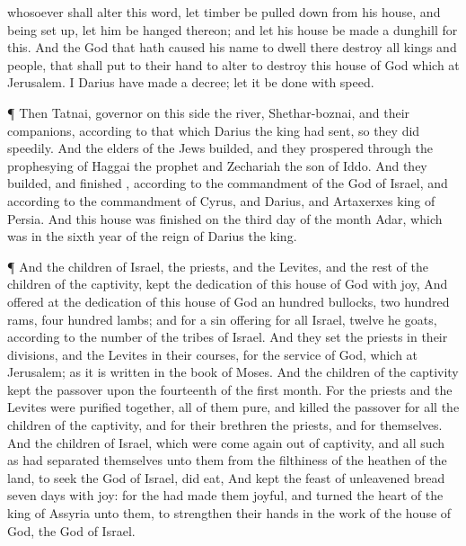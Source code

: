 {whosoever shall
alter
this
word, let
timber be pulled
down
from his
house, and being set
up, let him be
hanged
thereon; and let his
house be
made a
dunghill
for
this.
And the
God that hath caused his
name to
dwell
there
destroy
all
kings and
people, that shall
put to their
hand to
alter
{} to
destroy
this
house of
God which
{} at
Jerusalem.
I
Darius have
made a
decree; let it be
done with
speed.
\par }{\PP {}¶
Then
Tatnai,
governor on this
side the
river,
Shethar-boznai, and their
companions,
according to that which
Darius the
king had
sent,
so they
did
speedily.
And the
elders of the
Jews
builded, and they
prospered through the
prophesying of
Haggai the
prophet and
Zechariah the
son of
Iddo. And they
builded, and
finished
{},
according to the
commandment of the
God of
Israel, and according to the
commandment of
Cyrus, and
Darius, and
Artaxerxes
king of
Persia.
And
this
house was
finished
on the
third
day of the
month
Adar, which
was in the
sixth
year of the
reign of
Darius the
king.
\par }{\PP {}¶ And the
children of
Israel, the
priests, and the
Levites, and the
rest of the
children of the
captivity,
kept the
dedication of
this
house of
God with
joy,
And
offered at the
dedication of
this
house of
God an
hundred
bullocks, two
hundred
rams,
four
hundred
lambs; and for a sin
offering
for
all
Israel,
twelve
he
goats, according to the
number of the
tribes of
Israel.
And they
set the
priests in their
divisions, and the
Levites in their
courses,
for the
service of
God, which
{} at
Jerusalem; as it is
written in the
book of
Moses.
And the
children of the
captivity
kept the
passover upon the
fourteenth
{} of the
first
month.
For the
priests and the
Levites were
purified
together, all of them
{}
pure, and
killed the
passover for all the
children of the
captivity, and for their
brethren the
priests, and for themselves.
And the
children of
Israel, which were come
again out of
captivity, and all such as had
separated themselves unto them from the
filthiness of the
heathen of the
land, to
seek the
{}
God of
Israel, did
eat,
And
kept the
feast of unleavened
bread
seven
days with
joy: for the
{} had made them
joyful, and
turned the
heart of the
king of
Assyria unto them, to
strengthen their
hands in the
work of the
house of
God, the
God of
Israel.

}

